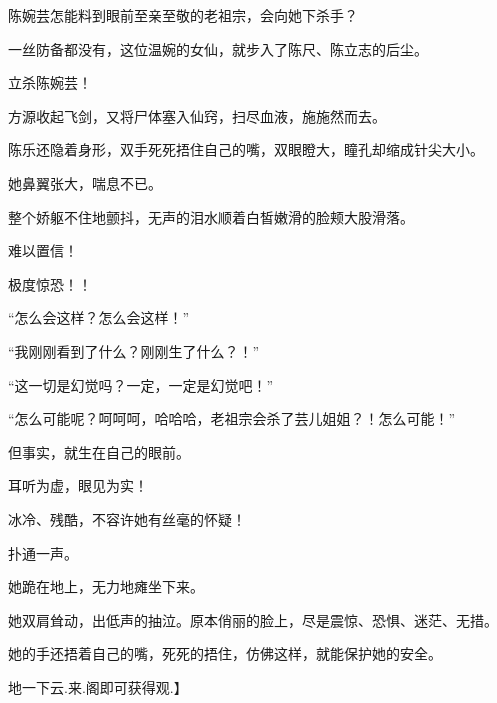 \begin{this_body}
陈婉芸怎能料到眼前至亲至敬的老祖宗，会向她下杀手？

一丝防备都没有，这位温婉的女仙，就步入了陈尺、陈立志的后尘。

立杀陈婉芸！

方源收起飞剑，又将尸体塞入仙窍，扫尽血液，施施然而去。

陈乐还隐着身形，双手死死捂住自己的嘴，双眼瞪大，瞳孔却缩成针尖大小。

她鼻翼张大，喘息不已。

整个娇躯不住地颤抖，无声的泪水顺着白皙嫩滑的脸颊大股滑落。

难以置信！

极度惊恐！！

“怎么会这样？怎么会这样！”

“我刚刚看到了什么？刚刚生了什么？！”

“这一切是幻觉吗？一定，一定是幻觉吧！”

“怎么可能呢？呵呵呵，哈哈哈，老祖宗会杀了芸儿姐姐？！怎么可能！”

但事实，就生在自己的眼前。

耳听为虚，眼见为实！

冰冷、残酷，不容许她有丝毫的怀疑！

扑通一声。

她跪在地上，无力地瘫坐下来。

她双肩耸动，出低声的抽泣。原本俏丽的脸上，尽是震惊、恐惧、迷茫、无措。

她的手还捂着自己的嘴，死死的捂住，仿佛这样，就能保护她的安全。

地一下云.来.阁即可获得观.】

\end{this_body}

